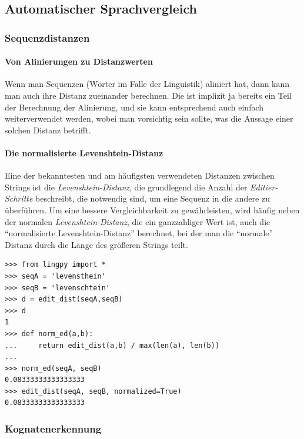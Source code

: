
\subsection{Automatischer Sprachvergleich}

\subsubsection{\texorpdfstring{{Sequenzdistanzen}}{Sequenzdistanzen}}

\paragraph{Von Alinierungen zu Distanzwerten}

Wenn man Sequenzen (Wörter im Falle der Linguistik) aliniert hat, dann
kann man auch ihre Distanz zueinander berechnen. Die ist implizit ja
bereits ein Teil der Berechnung der Alinierung, und sie kann
entsprechend auch einfach weiterverwendet werden, wobei man vorsichtig
sein sollte, was die Aussage einer solchen Distanz betrifft.



\paragraph{Die normalisierte Levenshtein-Distanz}

Eine der bekanntesten und am häufigsten verwendeten Distanzen zwischen
Strings ist die \emph{Levenshtein-Distanz}, die grundlegend die Anzahl
der \emph{Editier-Schritte} beschreibt, die notwendig sind, um eine
Sequenz in die andere zu überführen. Um eine bessere Vergleichbarkeit zu
gewährleisten, wird häufig neben der normalen
\emph{Levenshtein-Distanz}, die ein ganzzahliger Wert ist, auch die
``normalisierte Levenshtein-Distanz'' berechnet, bei der man die
``normale'' Distanz durch die Länge des größeren Strings teilt.

\begin{verbatim}
>>> from lingpy import *
>>> seqA = 'levensthein'
>>> seqB = 'levenschtein'
>>> d = edit_dist(seqA,seqB)
>>> d
1
>>> def norm_ed(a,b):
...     return edit_dist(a,b) / max(len(a), len(b))
...
>>> norm_ed(seqA, seqB)
0.08333333333333333
>>> edit_dist(seqA, seqB, normalized=True)
0.08333333333333333
\end{verbatim}



\subsubsection{\texorpdfstring{{Kognatenerkennung}}{Kognatenerkennung}}

